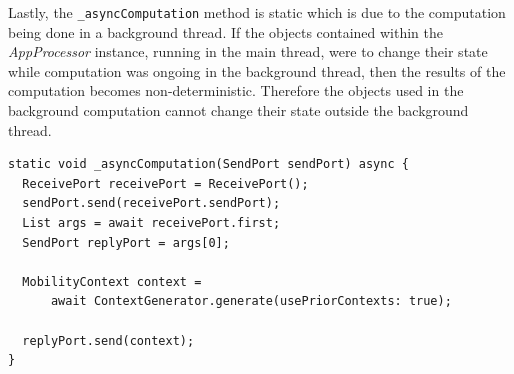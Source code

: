 Lastly, the \verb|_asyncComputation| method is static which is due to the computation being done in a background thread. If the objects contained within the \textit{AppProcessor} instance, running in the main thread, were to change their state while computation was ongoing in the background thread, then the results of the computation becomes non-deterministic. Therefore the objects used in the background computation cannot change their state outside the background thread. 

\begin{verbatim}
static void _asyncComputation(SendPort sendPort) async {
  ReceivePort receivePort = ReceivePort();
  sendPort.send(receivePort.sendPort);
  List args = await receivePort.first;
  SendPort replyPort = args[0];

  MobilityContext context =
      await ContextGenerator.generate(usePriorContexts: true);

  replyPort.send(context);
}
\end{verbatim}


